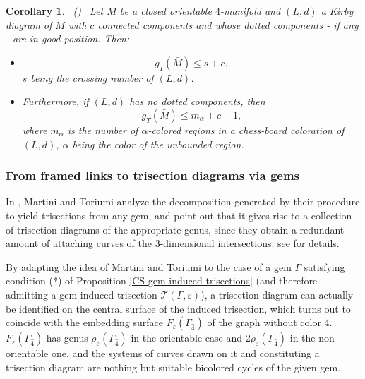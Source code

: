 \documentclass[12pt,a4paper]{article}
\newtheorem{corollary}[lemma]{Corollary}
\newcommand{\e}{\varepsilon}
\begin{document}
\begin{corollary}\label{disconnected_diagrams} \  {\rm (\cite{Casali-Cristofori trisection bis})} \ 
Let  $\bar M$ be a closed orientable $4$-manifold and $(L,d)$ a Kirby diagram of $\bar M$ with $c$ connected components and whose dotted components - if any - are in good position. Then:
\begin{itemize}
\item[(i)]
 $$g_T(\bar M) \le s+c ,$$  $s$ being the crossing number of $(L,d)$. 
\item[(ii)]
Furthermore, if  $(L,d)$ has no dotted components,
then 
$$g_T(\bar M) \le m_\alpha+c-1,$$
where $m_{\alpha}$ is the number of $\alpha$-colored regions in a chess-board coloration of $(L,d)$, $\alpha$  being the color of the  unbounded region.
\end{itemize}
\end{corollary}

\medskip

\subsubsection{From framed links to trisection diagrams via gems} \label{ss.from_Kirby_to_trisection_diagrams}
\par \noindent

In \cite{Martini-Toriumi}, Martini and Toriumi analyze the decomposition  generated by their procedure to yield trisections from any gem, and point out that it gives rise to a collection of trisection diagrams of the appropriate genus, since they obtain a redundant amount of attaching curves of the 3-dimensional intersections: see \cite[Section 4.6]{Martini-Toriumi} for details. 

\smallskip

By adapting the idea of Martini and Toriumi to the case of a gem $\Gamma$ satisfying condition (*) of Proposition \ref{CS gem-induced trisections} 
(and therefore admitting a gem-induced trisection $\mathcal T(\Gamma, \e)$), a trisection diagram can actually be identified on the central surface of the induced trisection,  which turns out to coincide with 
the embedding surface $F_\e(\Gamma_{\hat 4})$ of the graph without color 4. 
$F_\e(\Gamma_{\hat 4})$ has genus $\rho_{\e}(\Gamma_{\hat 4})$ in the orientable case and $2\rho_{\e}(\Gamma_{\hat 4})$ in the non-orientable one, and the systems of curves drawn on it and constituting a trisection diagram are nothing but suitable bicolored cycles of the given gem. 
 
\end{document}
